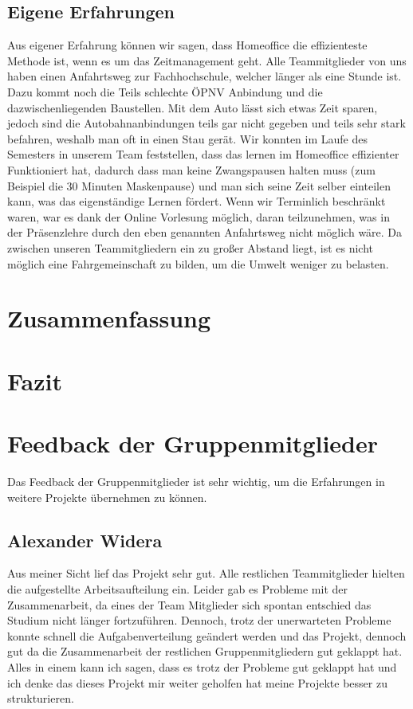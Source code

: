 \documentclass[a4paper,12pt]{scrartcl}
\begin{document}
\subsection{Eigene Erfahrungen}
Aus eigener Erfahrung können wir sagen, dass Homeoffice die effizienteste Methode ist, wenn es um das Zeitmanagement geht. Alle Teammitglieder von uns haben einen Anfahrtsweg zur Fachhochschule, welcher länger als eine Stunde ist. Dazu kommt noch die Teils schlechte ÖPNV Anbindung und die dazwischenliegenden Baustellen. Mit dem Auto lässt sich etwas Zeit sparen, jedoch sind die Autobahnanbindungen teils gar nicht gegeben und teils sehr stark befahren, weshalb man oft in einen Stau gerät. Wir konnten im Laufe des Semesters in unserem Team feststellen, dass das lernen im Homeoffice effizienter Funktioniert hat, dadurch dass man keine Zwangspausen halten muss (zum Beispiel die 30 Minuten Maskenpause) und man sich seine Zeit selber einteilen kann, was das eigenständige Lernen fördert. Wenn wir Terminlich beschränkt waren, war es dank der Online Vorlesung möglich, daran teilzunehmen, was in der Präsenzlehre durch den eben genannten Anfahrtsweg nicht möglich wäre. Da zwischen unseren Teammitgliedern ein zu großer Abstand liegt, ist es nicht möglich eine Fahrgemeinschaft zu bilden, um die Umwelt weniger zu belasten.

\section{Zusammenfassung}
\section{Fazit}

\section{Feedback der Gruppenmitglieder}
Das Feedback der Gruppenmitglieder ist sehr wichtig, um die Erfahrungen in weitere Projekte übernehmen zu können.

\subsection{Alexander Widera}
Aus meiner Sicht lief das Projekt sehr gut. Alle restlichen Teammitglieder hielten die aufgestellte Arbeitsaufteilung ein. Leider gab es Probleme mit der Zusammenarbeit, da eines der Team Mitglieder sich spontan entschied das Studium nicht länger fortzuführen. Dennoch, trotz der unerwarteten Probleme konnte schnell die Aufgabenverteilung geändert werden und das Projekt, dennoch gut da die Zusammenarbeit der restlichen Gruppenmitgliedern gut geklappt hat. Alles in einem kann ich sagen, dass es trotz der Probleme gut geklappt hat und ich denke das dieses Projekt mir weiter geholfen hat meine Projekte besser zu strukturieren.
\end{document}

